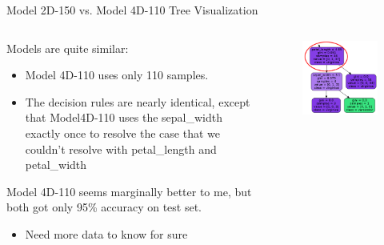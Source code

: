 \documentclass[aspectratio=169]{../latex_main/tntbeamer}  %
\begin{document}
	
	
	\begin{frame}{Model 2D-150 vs. Model 4D-110 Tree Visualization}
	    \begin{columns}
	        \begin{column}{.5\textwidth}
	                Models are quite similar:
	                \begin{itemize}
	                    \item Model 4D-110 uses only 110 samples.
	                    \item The decision rules are nearly identical, except that Model4D-110 uses the sepal\_width exactly once to resolve the case that we couldn’t resolve with petal\_length and petal\_width
	                \end{itemize}
	                Model 4D-110 seems marginally better to me, but both got only 95\% accuracy on test set. 
	                \begin{itemize}
	                    \item Need more data to know for sure
	                \end{itemize}
	        \end{column}
	   
	        \begin{column}{.5\textwidth}
	                \begin{figure}
	                    \includegraphics[scale=.33]{Bild34}
	                \end{figure}
	        \end{column}
	    \end{columns}
	 
	\end{frame}
	
\end{document}
